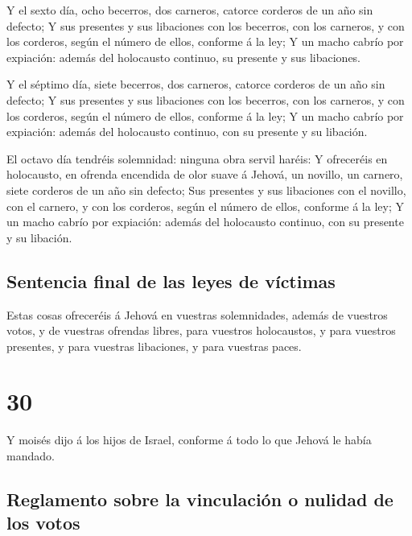  Y el sexto día, ocho becerros, dos carneros, catorce
corderos de un año sin defecto;  Y sus presentes y sus
libaciones con los becerros, con los carneros, y con los corderos, según
el número de ellos, conforme á la ley;  Y un macho cabrío
por expiación: además del holocausto continuo, su presente y sus
libaciones.

 Y el séptimo día, siete becerros, dos carneros, catorce
corderos de un año sin defecto;  Y sus presentes y sus
libaciones con los becerros, con los carneros, y con los corderos, según
el número de ellos, conforme á la ley;  Y un macho cabrío
por expiación: además del holocausto continuo, con su presente y su
libación.

 El octavo día tendréis solemnidad: ninguna obra servil
haréis:  Y ofreceréis en holocausto, en ofrenda encendida
de olor suave á Jehová, un novillo, un carnero, siete corderos de un año
sin defecto;  Sus presentes y sus libaciones con el
novillo, con el carnero, y con los corderos, según el número de ellos,
conforme á la ley;  Y un macho cabrío por expiación: además
del holocausto continuo, con su presente y su libación.

\hypertarget{sentencia-final-de-las-leyes-de-vuxedctimas}{%
\subsection{Sentencia final de las leyes de
víctimas}\label{sentencia-final-de-las-leyes-de-vuxedctimas}}

 Estas cosas ofreceréis á Jehová en vuestras solemnidades,
además de vuestros votos, y de vuestras ofrendas libres, para vuestros
holocaustos, y para vuestros presentes, y para vuestras libaciones, y
para vuestras paces.

\hypertarget{section-29}{%
\section{30}\label{section-29}}

 Y moisés dijo á los hijos de Israel, conforme á todo lo que
Jehová le había mandado.

\hypertarget{reglamento-sobre-la-vinculaciuxf3n-o-nulidad-de-los-votos}{%
\subsection{Reglamento sobre la vinculación o nulidad de los
votos}\label{reglamento-sobre-la-vinculaciuxf3n-o-nulidad-de-los-votos}}

